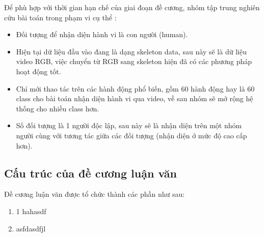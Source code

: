 Để phù hợp với thời gian  hạn chế của giai đoạn đề cương, nhóm tập trung nghiên cứu bài toán trong phạm vi cụ thể :
\begin{itemize}
    \item Đối tượng để nhận diện hành vi là con người (human).
    \item Hiện tại dữ liệu đầu vào đang là dạng skeleton data, sau này sẽ là dữ liệu video RGB, việc chuyển từ RGB sang skeleton hiện
          đã có các phương pháp hoạt động tốt.
    \item Chỉ mới thao tác trên các hành động phổ biến, gồm 60 hành động hay là 60 class cho bài toán nhận diện hành vi qua video, về sau nhóm sẽ mở rộng
          hệ thống cho nhiều class hơn.
    \item Số đối tượng là 1 người độc lập, sau này sẽ là nhận diện trên một nhóm người cùng với tương tác giữa các đối tượng (nhận diện ở mức độ cao cấp hơn).
\end{itemize}

\subsection{Cấu trúc của đề cương luận văn}
Đề cương luận văn được tổ chức thành các  phần như sau:


\begin{enumerate}[Chương]
    \item 1 hahasdf
    \item asfdasdfjl

\end{enumerate}


